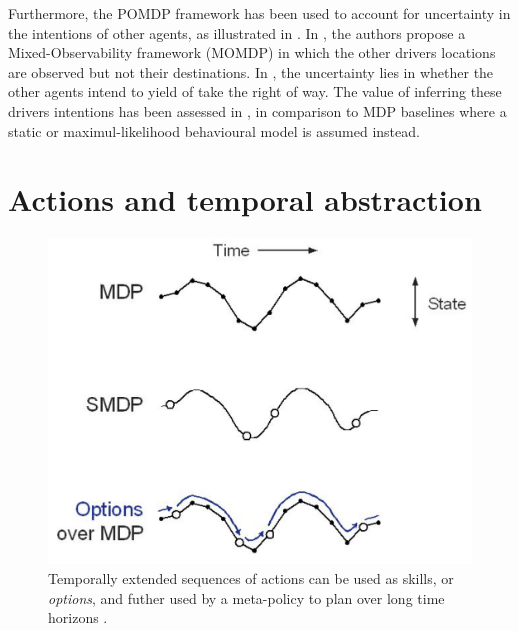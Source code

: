 Furthermore, the POMDP framework has been used to account for uncertainty in the intentions of other agents, as illustrated in . In \citep{Bandyopadhyay2013}, the authors propose a Mixed-Observability framework (MOMDP) in which the other drivers locations are observed but not their destinations. In \citep{Barbier2018}, the uncertainty lies in whether the other agents intend to yield of take the right of way. The value of inferring these drivers intentions has been assessed in \citep{Sunberg2017}, in comparison to MDP baselines where a static or maximul-likelihood behavioural model is assumed instead.



\section{Actions and temporal abstraction}
\label{sec:temporal-abstraction}

\begin{figure}[th]
	\centering
	\includegraphics[width=0.5\linewidth]{img/smdp}
	\caption{Temporally extended sequences of actions can be used as skills, or \emph{options}, and futher used by a meta-policy to plan over long time horizons \citep{Sutton1999}.}
	\label{fig:smdp}
\end{figure}

